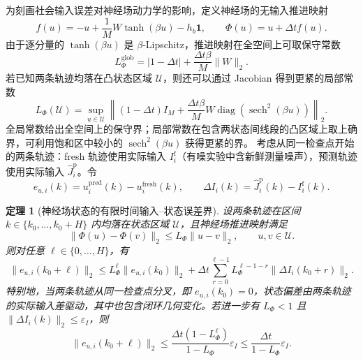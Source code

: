 \documentclass[UTF8,fontset=windows,11pt]{ctexart}
\newtheorem{theorem}{定理}[section]
\begin{document}
为刻画社会输入误差对神经场动力学的影响，定义神经场的无输入推进映射
\begin{equation}
 f(u)=-u+\frac{1}{M}W\tanh(\beta u)-h_b\bm 1,
 \qquad
 \Phi(u)=u+\Delta t f(u).
 \label{eq:v2_field_map}
\end{equation}
由于逐分量的 $\tanh(\beta u)$ 是 $\beta$-Lipschitz，推进映射在全空间上可取保守常数
\begin{equation}
 L_\Phi^{\mathrm{glob}}
 =|1-\Delta t|+\frac{\Delta t\beta}{M}\|W\|_2.
 \label{eq:v2_global_lipschitz}
\end{equation}
若已知两条轨迹均落在凸状态区域 $\mathcal U$，则还可以通过 Jacobian 得到更紧的局部常数
\begin{equation}
 L_\Phi(\mathcal U)=
 \sup_{u\in\mathcal U}
 \left\|(1-\Delta t)I_M+
 \frac{\Delta t\beta}{M}W
 \operatorname{diag}\!\left(\operatorname{sech}^2(\beta u)\right)
 \right\|_2.
 \label{eq:v2_local_lipschitz}
\end{equation}
全局常数给出全空间上的保守界；局部常数在包含两状态间线段的凸区域上取上确界，可利用饱和区中较小的 $\operatorname{sech}^2(\beta u)$ 获得更紧的界。
考虑从同一检查点开始的两条轨迹：fresh 轨迹使用实际输入 $I_i^{\mathrm f}$（有噪实验中含新鲜测量噪声），预测轨迹使用实际输入 $\widehat J_i^{\mathrm p}$。令
\begin{equation}
 e_{u,i}(k)=u_i^{\mathrm{pred}}(k)-u_i^{\mathrm{fresh}}(k),
 \qquad
 \Delta I_i(k)=\widehat J_i^{\mathrm p}(k)-I_i^{\mathrm f}(k).
 \label{eq:v2_state_error}
\end{equation}

\begin{theorem}[神经场状态的有限时间输入--状态误差界]
\label{thm:v2_field_bound}
设两条轨迹在区间 $k\in\{k_0,\ldots,k_0+H\}$ 内均落在状态区域 $\mathcal U$，且神经场推进映射满足
\begin{equation}
 \|\Phi(u)-\Phi(v)\|_2\le L_\Phi\|u-v\|_2,
 \qquad u,v\in\mathcal U.
 \label{eq:v2_lipschitz_phi}
\end{equation}
则对任意 $\ell\in\{0,\ldots,H\}$，有
\begin{equation}
 \|e_{u,i}(k_0+\ell)\|_2
 \le L_\Phi^\ell\|e_{u,i}(k_0)\|_2
 +\Delta t\sum_{r=0}^{\ell-1}
 L_\Phi^{\ell-1-r}\|\Delta I_i(k_0+r)\|_2.
 \label{eq:v2_field_finite_bound}
\end{equation}
特别地，当两条轨迹从同一检查点分叉，即 $e_{u,i}(k_0)=0$，状态偏差由两条轨迹的实际输入差驱动，其中也包含闭环几何变化。若进一步有 $L_\Phi<1$ 且 $\|\Delta I_i(k)\|_2\le\varepsilon_I$，则
\begin{equation}
 \|e_{u,i}(k_0+\ell)\|_2
 \le
 \frac{\Delta t(1-L_\Phi^\ell)}{1-L_\Phi}\varepsilon_I
 \le\frac{\Delta t}{1-L_\Phi}\varepsilon_I.
 \label{eq:v2_field_contracting_bound}
\end{equation}
\end{theorem}
\end{document}
